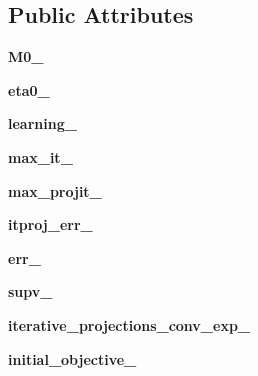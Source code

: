\subsection*{Public Attributes}
\begin{DoxyCompactItemize}
\item 
{\bfseries M0\+\_\+}\hypertarget{classdml_1_1lsi_1_1LSI_a4a7b5fcb9211906739bc6624e9e0898e}{}\label{classdml_1_1lsi_1_1LSI_a4a7b5fcb9211906739bc6624e9e0898e}

\item 
{\bfseries eta0\+\_\+}\hypertarget{classdml_1_1lsi_1_1LSI_a5abbe8d95bf5d503b573952267b2e28d}{}\label{classdml_1_1lsi_1_1LSI_a5abbe8d95bf5d503b573952267b2e28d}

\item 
{\bfseries learning\+\_\+}\hypertarget{classdml_1_1lsi_1_1LSI_aa35166d1dfa8883f703b0a42d8fedb1f}{}\label{classdml_1_1lsi_1_1LSI_aa35166d1dfa8883f703b0a42d8fedb1f}

\item 
{\bfseries max\+\_\+it\+\_\+}\hypertarget{classdml_1_1lsi_1_1LSI_a4bb51eeeacaf2e7e64ab2e0dbc999781}{}\label{classdml_1_1lsi_1_1LSI_a4bb51eeeacaf2e7e64ab2e0dbc999781}

\item 
{\bfseries max\+\_\+projit\+\_\+}\hypertarget{classdml_1_1lsi_1_1LSI_a8cf51ca43d7e1417067c269936885189}{}\label{classdml_1_1lsi_1_1LSI_a8cf51ca43d7e1417067c269936885189}

\item 
{\bfseries itproj\+\_\+err\+\_\+}\hypertarget{classdml_1_1lsi_1_1LSI_afaef7cf510f97b2c759073eae68d1ef3}{}\label{classdml_1_1lsi_1_1LSI_afaef7cf510f97b2c759073eae68d1ef3}

\item 
{\bfseries err\+\_\+}\hypertarget{classdml_1_1lsi_1_1LSI_aa777e43a117aa59c54f1548296d74b10}{}\label{classdml_1_1lsi_1_1LSI_aa777e43a117aa59c54f1548296d74b10}

\item 
{\bfseries supv\+\_\+}\hypertarget{classdml_1_1lsi_1_1LSI_a9b85e6908563f1ec116ae6d5e4e19a5d}{}\label{classdml_1_1lsi_1_1LSI_a9b85e6908563f1ec116ae6d5e4e19a5d}

\item 
{\bfseries iterative\+\_\+projections\+\_\+conv\+\_\+exp\+\_\+}\hypertarget{classdml_1_1lsi_1_1LSI_a8f65b277e2118e12a5f2f0ad7d44a6d8}{}\label{classdml_1_1lsi_1_1LSI_a8f65b277e2118e12a5f2f0ad7d44a6d8}

\item 
{\bfseries initial\+\_\+objective\+\_\+}\hypertarget{classdml_1_1lsi_1_1LSI_a11c19f24266dae0f197527caea3e4e20}{}\label{classdml_1_1lsi_1_1LSI_a11c19f24266dae0f197527caea3e4e20}


\end{DoxyCompactItemize}
